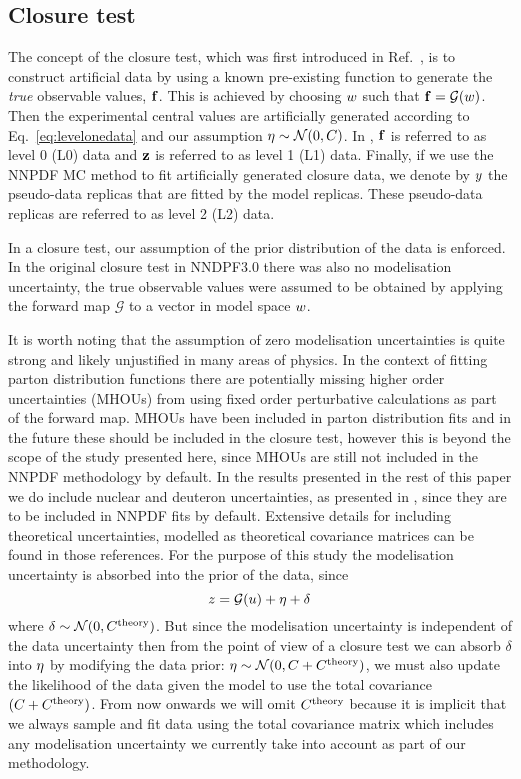 \subsection{Closure test}
\label{sec:closure-test-intro}

The concept of the closure test, which was first introduced in
Ref.~\cite{nnpdf30}, is to construct artificial data by using a known
pre-existing function to generate the {\em true} observable values, $\mathbf{f}$.
This is achieved by choosing $w$ such that $\mathbf{f} =
\mathcal{G}(w)$. Then the experimental central values are artificially
generated according to Eq.~\ref{eq:levelonedata} and our assumption $\mathbf{\eta}
\sim \mathcal{N}(0, C)$. In \cite{nnpdf30}, $\mathbf{f}$ is referred to as
level 0 (L0) data and $\mathbf{z}$ is referred to as level 1 (L1) data.
Finally, if we use the NNPDF MC method to fit artificially generated closure
data, we denote by $y$ the pseudo-data replicas that are fitted by the
model replicas. These pseudo-data replicas are referred to as level 2 (L2) data.

In a closure test, our assumption of the prior distribution of the data is
enforced. In the original closure test in NNDPF3.0 there was also no
modelisation uncertainty, the true observable values were assumed to be obtained
by applying the forward map $\mathcal G$ to a vector in model space $w$.

It is worth noting that the assumption of zero modelisation uncertainties is
quite strong and likely unjustified in many areas of physics. In the context of
fitting parton distribution functions there are potentially missing higher order
uncertainties (MHOUs) from using fixed order perturbative calculations as part
of the forward map. MHOUs have been included in parton distribution fits
\cite{AbdulKhalek:2019ihb} and in the future these should be included in the
closure test, however this is beyond the scope of the study presented here,
since MHOUs are still not included in the NNPDF methodology by default. In the
results presented in the rest of this paper we do include nuclear and deuteron
uncertainties, as presented in \cite{Ball:2018twp, Ball:2020xqw}, since they are
to be included in NNPDF fits by default. Extensive details for including
theoretical uncertainties, modelled as theoretical covariance matrices can be
found in those references. For the purpose of this study the modelisation
uncertainty is absorbed into the prior of the data, since
\begin{equation}
    z = \mathcal{G}(u) + \eta + \delta
\end{equation}
where $\delta \sim \mathcal{N}(0, C^{\rm theory})$. But since the modelisation
uncertainty is independent of the data uncertainty then from the point of view
of a closure test we can absorb $\delta$ into $\eta$ by modifying the data
prior: $\eta \sim \mathcal{N}(0, C + C^{\rm theory})$, we must also update the
likelihood of the data given the model to use the total covariance $(C + C^{\rm
theory})$. From now onwards we will omit $C^{\rm theory}$ because it is
implicit that we always sample and fit data using the total covariance matrix
which includes any modelisation uncertainty we currently take into account as
part of our methodology.


